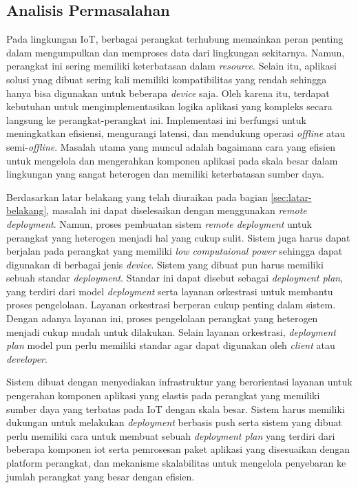 \subsection{Analisis Permasalahan}
\label{sec:analisis-permasalahan}

Pada lingkungan IoT, berbagai perangkat terhubung memainkan peran penting dalam mengumpulkan dan memproses data dari lingkungan sekitarnya. Namun, perangkat ini sering memiliki keterbatasan dalam \textit{resource}. Selain itu, aplikasi solusi ynag dibuat sering kali memiliki kompatibilitas yang rendah sehingga hanya bisa digunakan untuk beberapa \textit{device} saja. Oleh karena itu, terdapat kebutuhan untuk mengimplementasikan logika aplikasi yang kompleks secara langsung ke perangkat-perangkat ini. Implementasi ini berfungsi untuk meningkatkan efisiensi, mengurangi latensi, dan mendukung operasi \textit{offline} atau semi-\textit{offline}. Masalah utama yang muncul adalah bagaimana cara yang efisien untuk mengelola dan mengerahkan komponen aplikasi pada skala besar dalam lingkungan yang sangat heterogen dan memiliki keterbatasan sumber daya.

Berdasarkan latar belakang yang telah diuraikan pada bagian \ref{sec:latar-belakang}, masalah ini dapat diselesaikan dengan menggunakan \textit{remote deployment}. Namun, proses pembuatan sistem \textit{remote deployment} untuk perangkat yang heterogen menjadi hal yang cukup sulit. Sistem juga harus dapat berjalan pada perangkat yang memiliki \textit{low computaional power}  sehingga dapat digunakan di berbagai jenis \textit{device}. Sistem yang dibuat pun harus memiliki sebuah standar \textit{deployment}. Standar ini dapat disebut sebagai \textit{deployment plan}, yang terdiri dari model \textit{deployment} serta layanan orkestrasi untuk membantu proses pengelolaan. Layanan orkestrasi berperan cukup penting dalam sistem. Dengan adanya layanan ini, proses pengelolaan perangkat yang heterogen menjadi cukup mudah untuk dilakukan. Selain layanan orkestrasi, \textit{deployment plan} model pun perlu memiliki standar agar dapat digunakan oleh \textit{client} atau \textit{developer}.

Sistem dibuat dengan menyediakan infrastruktur yang berorientasi layanan untuk pengerahan komponen aplikasi yang elastis pada perangkat yang memiliki sumber daya yang terbatas pada IoT dengan skala besar. Sistem harus memiliki dukungan untuk melakukan \textit{deployment} berbasis push serta sistem yang dibuat perlu memiliki cara untuk membuat sebuah \textit{deployment plan} yang terdiri dari beberapa komponen iot serta
pemrosesan paket aplikasi yang disesuaikan dengan platform perangkat, dan mekanisme skalabilitas untuk mengelola penyebaran ke jumlah perangkat yang besar dengan efisien.

